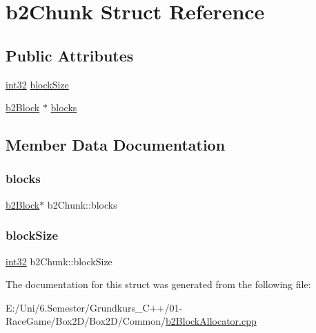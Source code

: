 \hypertarget{structb2_chunk}{}\section{b2\+Chunk Struct Reference}
\label{structb2_chunk}
\subsection*{Public Attributes}
\begin{DoxyCompactItemize}
\item 
\mbox{\hyperlink{b2_settings_8h_a43d43196463bde49cb067f5c20ab8481}{int32}} \mbox{\hyperlink{structb2_chunk_a731df6d026298426622990c251cf742a}{block\+Size}}
\item 
\mbox{\hyperlink{structb2_block}{b2\+Block}} $\ast$ \mbox{\hyperlink{structb2_chunk_aa45617a36287b3dea2130c426cfd42d2}{blocks}}
\end{DoxyCompactItemize}


\subsection{Member Data Documentation}
\mbox{\label{structb2_chunk_aa45617a36287b3dea2130c426cfd42d2}} 
\subsubsection{\texorpdfstring{blocks}{blocks}}
{\footnotesize\ttfamily \mbox{\hyperlink{structb2_block}{b2\+Block}}$\ast$ b2\+Chunk\+::blocks}

\mbox{\label{structb2_chunk_a731df6d026298426622990c251cf742a}} 
\subsubsection{\texorpdfstring{blockSize}{blockSize}}
{\footnotesize\ttfamily \mbox{\hyperlink{b2_settings_8h_a43d43196463bde49cb067f5c20ab8481}{int32}} b2\+Chunk\+::block\+Size}



The documentation for this struct was generated from the following file\+:\begin{DoxyCompactItemize}
\item 
E\+:/\+Uni/6.\+Semester/\+Grundkurs\+\_\+\+C++/01-\/\+Race\+Game/\+Box2\+D/\+Box2\+D/\+Common/\mbox{\hyperlink{b2_block_allocator_8cpp}{b2\+Block\+Allocator.\+cpp}}\end{DoxyCompactItemize}
